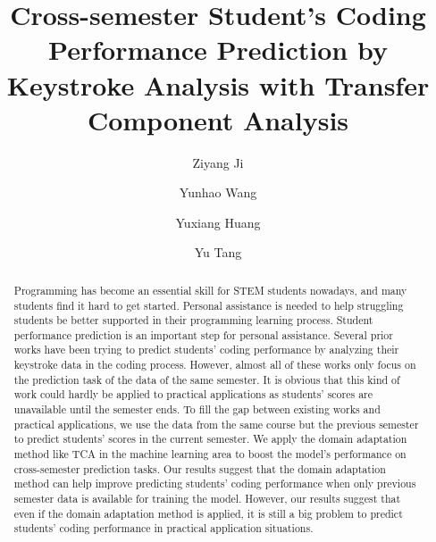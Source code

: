 \documentclass[sigconf,final]{acmart}
\begin{document}
\fancyfoot[C]{\thepage} 
\title{Cross-semester Student's Coding Performance Prediction by Keystroke Analysis with Transfer Component Analysis}

\author{Ziyang Ji}

\author{Yunhao Wang}

\author{Yuxiang Huang}

\author{Yu Tang}


\renewcommand{\shortauthors}{Ziyang Ji, Yunhao Wang, Yuxiang Huang and Yu Tang.}


\begin{abstract}
Programming has become an essential skill for STEM students nowadays, and many students find it hard to get started. Personal assistance is needed to help struggling students be better supported in their programming learning process. Student performance prediction is an important step for personal assistance. Several prior works have been trying to predict students' coding performance by analyzing their keystroke data in the coding process. However, almost all of these works only focus on the prediction task of the data of the same semester. It is obvious that this kind of work could hardly be applied to practical applications as students' scores are unavailable until the semester ends. To fill the gap between existing works and practical applications, we use the data from the same course but the previous semester to predict students' scores in the current semester. We apply the domain adaptation method like TCA in the machine learning area to boost the model's performance on cross-semester prediction tasks. Our results suggest that the domain adaptation method can help improve predicting students' coding performance when only previous semester data is available for training the model. However, our results suggest that even if the domain adaptation method is applied, it is still a big problem to predict students' coding performance in practical application situations.

\end{abstract}
\end{document}
